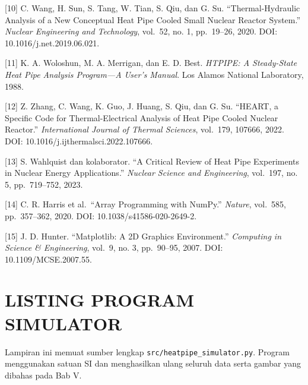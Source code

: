 \documentclass[
  12pt,
  12pt,a4paper,oneside]{report}
\begin{document}
{[}10{]} C. Wang, H. Sun, S. Tang, W. Tian, S. Qiu, dan G. Su.
``Thermal-Hydraulic Analysis of a New Conceptual Heat Pipe Cooled Small
Nuclear Reactor System.'' \emph{Nuclear Engineering and Technology},
vol.~52, no. 1, pp.~19--26, 2020. DOI: 10.1016/j.net.2019.06.021.

{[}11{]} K. A. Woloshun, M. A. Merrigan, dan E. D. Best. \emph{HTPIPE: A
Steady-State Heat Pipe Analysis Program---A User's Manual}. Los Alamos
National Laboratory, 1988.

{[}12{]} Z. Zhang, C. Wang, K. Guo, J. Huang, S. Qiu, dan G. Su.
``HEART, a Specific Code for Thermal-Electrical Analysis of Heat Pipe
Cooled Nuclear Reactor.'' \emph{International Journal of Thermal
Sciences}, vol.~179, 107666, 2022. DOI:
10.1016/j.ijthermalsci.2022.107666.

{[}13{]} S. Wahlquist dan kolaborator. ``A Critical Review of Heat Pipe
Experiments in Nuclear Energy Applications.'' \emph{Nuclear Science and
Engineering}, vol.~197, no. 5, pp.~719--752, 2023.

{[}14{]} C. R. Harris et al.~``Array Programming with NumPy.''
\emph{Nature}, vol.~585, pp.~357--362, 2020. DOI:
10.1038/s41586-020-2649-2.

{[}15{]} J. D. Hunter. ``Matplotlib: A 2D Graphics Environment.''
\emph{Computing in Science \& Engineering}, vol.~9, no. 3, pp.~90--95,
2007. DOI: 10.1109/MCSE.2007.55.

\appendix

\hypertarget{listing-program-simulator}{%
\chapter{LISTING PROGRAM SIMULATOR}\label{listing-program-simulator}}

Lampiran ini memuat sumber lengkap \texttt{src/heatpipe\_simulator.py}.
Program menggunakan satuan SI dan menghasilkan ulang seluruh data serta
gambar yang dibahas pada Bab V.
\end{document}
